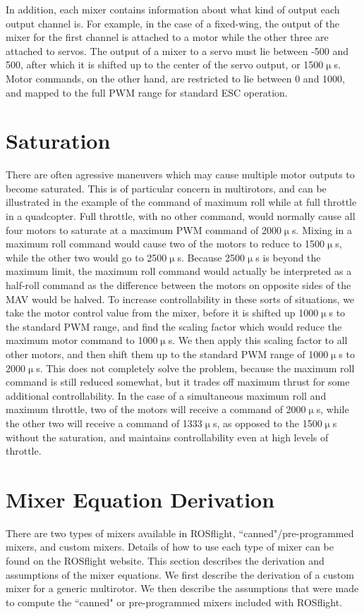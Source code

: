 \documentclass{article}
\begin{document}
In addition, each mixer contains information about what kind of output each output channel is.
For example, in the case of a fixed-wing, the output of the mixer for the first channel is attached to a motor while the other three are attached to servos.
The output of a mixer to a servo must lie between -500 and 500, after which it is shifted up to the center of the servo output, or 1500$\upmu$s.
Motor commands, on the other hand, are restricted to lie between 0 and 1000, and mapped to the full PWM range for standard ESC operation.

\section{Saturation}

There are often agressive maneuvers which may cause multiple motor outputs to become saturated.  This is of particular concern in multirotors, and can be illustrated in the example of the command of maximum roll while at full throttle in a quadcopter.  Full throttle, with no other command, would normally cause all four motors to saturate at a maximum PWM command of 2000$\upmu$s.  Mixing in a maximum roll command would cause two of the motors to reduce to 1500$\upmu$s, while the other two would go to 2500$\upmu$s.  Because 2500$\upmu$s is beyond the maximum limit, the maximum roll command would actually be interpreted as a half-roll command as the difference between the motors on opposite sides of the MAV would be halved.  To increase controllability in these sorts of situations, we take the motor control value from the mixer, before it is shifted up 1000$\upmu$s to the standard PWM range, and find the scaling factor which would reduce the maximum motor command to 1000$\upmu$s.  We then apply this scaling factor to all other motors, and then shift them up to the standard PWM range of 1000$\upmu$s to 2000$\upmu$s.  This does not completely solve the problem, because the maximum roll command is still reduced somewhat, but it trades off maximum thrust for some additional controllability. In the case of a simultaneous maximum roll and maximum throttle, two of the motors will receive a command of 2000$\upmu$s, while the other two will receive a command of 1333$\upmu$s, as opposed to the 1500$\upmu$s without the saturation, and maintains controllability even at high levels of throttle.


\section{Mixer Equation Derivation}\label{sec:derivation}
There are two types of mixers available in ROSflight, ``canned"/pre-programmed mixers, and custom mixers.
Details of how to use each type of mixer can be found on the ROSflight website.
This section describes the derivation and assumptions of the mixer equations.
We first describe the derivation of a custom mixer for a generic multirotor.
We then describe the assumptions that were made to compute the ``canned" or pre-programmed mixers included with ROSflight.
\end{document}
